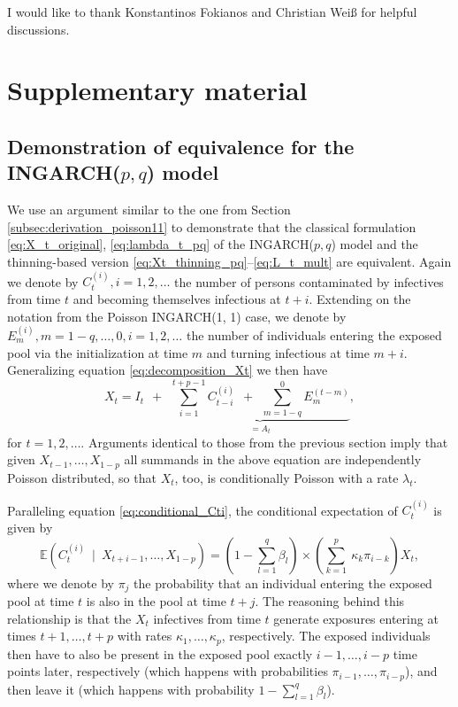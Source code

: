 \documentclass{article}
\begin{document}
I would like to thank Konstantinos Fokianos and Christian Wei{\ss} for helpful discussions.


{
\footnotesize


}


\section{Supplementary material} %

\subsection{Demonstration of equivalence for the INGARCH($p, q$) model}

We use an argument similar to the one from Section \ref{subsec:derivation_poisson11} to demonstrate that the classical formulation \eqref{eq:X_t_original}, \eqref{eq:lambda_t_pq} of the INGARCH($p, q$) model and the thinning-based version \eqref{eq:Xt_thinning_pq}--\eqref{eq:L_t_mult} are equivalent. Again we denote by $C_t^{(i)}, i = 1, 2, \dots$ the number of persons contaminated by infectives from time $t$ and becoming themselves infectious at $t + i$. Extending on the notation from the Poisson INGARCH(1, 1) case, we denote by $E^{(i)}_m, m = 1 - q, \dots, 0, i = 1, 2, \dots$ the number of individuals entering the exposed pool via the initialization at time $m$ and turning infectious at time $m + i$. Generalizing equation \eqref{eq:decomposition_Xt} we then have
$$
X_t = I_t \ \ + \ \ \underbrace{\sum_{i = 1}^{t + p - 1} C_{t - i}^{(i)} \ \ + \ \ \sum_{m = 1 - q}^0 E_m^{(t - m)}}_{= A_t},
$$
for $t = 1, 2, \dots$. Arguments identical to those from the previous section imply that given $X_{t - 1}, \dots, X_{1 - p}$ all summands in the above equation are independently Poisson distributed, so that $X_t$, too, is conditionally Poisson with a rate $\lambda_t$.

Paralleling equation \eqref{eq:conditional_Cti}, the conditional expectation of $C_t^{(i)}$ is given by
\begin{equation}
\mathbb{E}(C_t^{(i)} \ \mid \ X_{t + i - 1}, \dots, X_{1 - p}) = \left(1 - \sum_{l = 1}^q \beta_l \right) \times \left(\sum_{k = 1}^p\ \kappa_k \pi_{i - k}\right) X_t,\label{eq:ELt}
\end{equation}
where we denote by $\pi_j$ the probability that an individual entering the exposed pool at time $t$ is also in the pool at time $t + j$. The reasoning behind this relationship is that the $X_t$ infectives from time $t$ generate exposures entering at times $t + 1, \dots, t + p$ with rates $\kappa_1, \dots, \kappa_p$, respectively. The exposed individuals then have to also be present in the exposed pool exactly $i - 1, \dots, i - p$ time points later, respectively (which happens with probabilities $\pi_{i - 1}, \dots, \pi_{i - p}$), and then leave it (which happens with probability $1 - \sum_{l = 1}^q \beta_l$).
\end{document}
